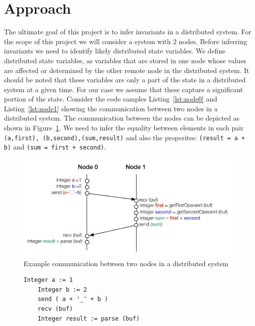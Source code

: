 \section{Approach}

The ultimate goal of this project is to infer invariants in a
distributed system. For the scope of this project we will consider a system with 2 nodes. Before inferring invariants we need to identify likely distributed
state variables. We define distributed state variables, as variables
that are stored in one node whose values are affected or determined by
the other remote node in the distributed system. It should be noted that
these variables are only a part of the state in a distributed system
at a given time. For our case we assume that these capture a
significant portion of the state. Consider the code samples
Listing~\ref{lst:node0} and Listing~\ref{lst:node1} showing the
communication between two nodes in a distributed system. The
communication between the nodes can be depicted as shown in
Figure~\ref{fig:sample_code_diag}. We need to infer the equality
between elements in each pair \texttt{(a,first),
(b,second),(sum,result)} and also the properites: \texttt{(result = a
+ b)} and \texttt{(sum = first + second)}.


\begin{figure}
  \includegraphics[width=\columnwidth]{sample_code.pdf}
  \caption{Example communication between two nodes in a distributed system}
  \label{fig:sample_code_diag}
\end{figure}

\begin{figure}
\begin{lstlisting}[caption={Sample code for Communication between 2 nodes - Node 0}, label=lst:node0]
    Integer a := 1
    Integer b := 2
    send ( a + '_' + b )
    recv (buf)
    Integer result := parse (buf)
\end{lstlisting}
\end{figure}

